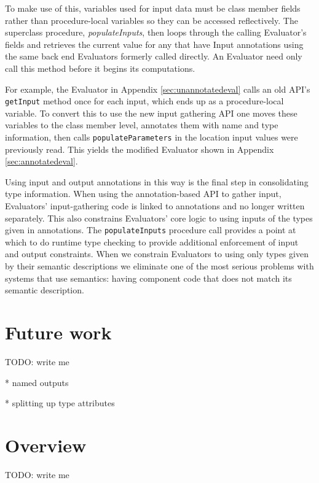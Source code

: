 \documentclass{article}
\begin{document}
To make use of this, variables used for input data must be class member fields rather than procedure-local variables so they can be accessed reflectively.
The superclass procedure, \emph{populateInputs}, then loops through the calling Evaluator's fields and retrieves the current value for any that have Input annotations using the same back end Evaluators formerly called directly.
An Evaluator need only call this method before it begins its computations.

For example, the Evaluator in Appendix \ref{sec:unannotatedeval} calls an old API's \texttt{getInput} method once for each input, which ends up as a procedure-local variable.
To convert this to use the new input gathering API one moves these variables to the class member level, annotates them with name and type information, then calls \texttt{populateParameters} in the location input values were previously read.
This yields the modified Evaluator shown in Appendix \ref{sec:annotatedeval}.

Using input and output annotations in this way is the final step in consolidating type information.
When using the annotation-based API to gather input, Evaluators' input-gathering code is linked to annotations and no longer written separately.
This also constrains Evaluators' core logic to using inputs of the types given in annotations.
The \texttt{populateInputs} procedure call provides a point at which to do runtime type checking to provide additional enforcement of input and output constraints.
When we constrain Evaluators to using only types given by their semantic descriptions we eliminate one of the most serious problems with systems that use semantics:  having component code that does not match its semantic description.

\section{Future work}

TODO:  write me

* named outputs

* splitting up type attributes

\section{Overview}

TODO:  write me

\clearpage


\end{document}
